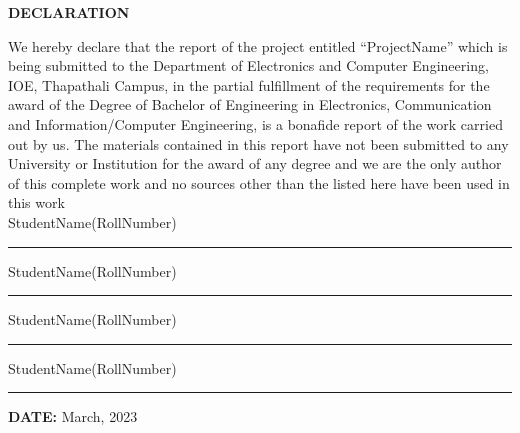 \newpage





\textbf{DECLARATION}


We hereby declare that the report of the project entitled “ProjectName” which is being submitted to the Department of Electronics and Computer Engineering, IOE, Thapathali Campus, in the partial fulfillment of the requirements for the award of the Degree of Bachelor of Engineering in Electronics, Communication and Information/Computer Engineering, is a bonafide report of the work carried out by us. The materials contained in this report have not been submitted to any University or Institution for the award of any degree and we are the only author of this complete work and no sources other than the listed here have been used in this work\\[0.50cm]

\vskip 1mm
  {\bf}
StudentName\hspace{1.1cm}(RollNumber) \hspace{0.9cm}  \rule{0.3\textwidth}{1pt}
\vskip 1mm
StudentName\hspace{1.1cm}(RollNumber) \hspace{0.9cm}  \rule{0.3\textwidth}{1pt}
\vskip 1mm
StudentName\hspace{1.1cm}(RollNumber) \hspace{0.9cm}  \rule{0.3\textwidth}{1pt}
\vskip 1mm
StudentName\hspace{1.1cm}(RollNumber) \hspace{0.9cm}  \rule{0.3\textwidth}{1pt}




{\bf DATE:} March, 2023


